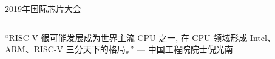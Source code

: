 
\begin{frame}{}
  \begin{center}
    \href{https://www.benchcouncil.org/conferences/ficc/2019/chips19/chips19.html}{2019年国际芯片大会}
  \end{center}
  \begin{columns}
  \end{columns}

  \vspace{0.60cm}
  \begin{center}
    ``RISC-V 很可能发展成为世界主流 CPU 之一,
    在 CPU 领域形成 Intel、\\[5pt]
    ARM、RISC-V 三分天下的格局。''
    \hfill --- 中国工程院院士\quad 倪光南
  \end{center}
\end{frame}
